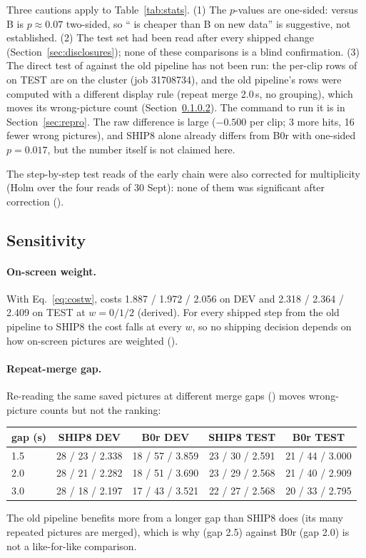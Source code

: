Three cautions apply to Table~\ref{tab:stats}. (1) The $p$-values are one-sided: \Dp{} versus B is $p \approx 0.07$
two-sided, so ``\Dp{} is cheaper than B on new data'' is suggestive, not established. (2) The test set had been read
after every shipped change (Section~\ref{sec:disclosures}); none of these comparisons is a blind confirmation. (3) The
direct test of \Dp{} against the old pipeline has not been run: the per-clip rows of \Dp{} on TEST are on the cluster
(job 31708734), and the old pipeline's rows were computed with a different display rule (repeat merge 2.0\,s, no
grouping), which moves its wrong-picture count (Section~\ref{sec:mergegap}). The command to run it is in
Section~\ref{sec:repro}. The raw difference is large ($-0.500$ per clip; 3 more hits, 16 fewer wrong pictures), and
SHIP8 alone already differs from B0r with one-sided $p = 0.017$, but the number itself is not claimed here.

The step-by-step test reads of the early chain were also corrected for multiplicity (Holm over the four reads of
30 Sept): none of them was significant after correction ().

\subsection{Sensitivity}\label{sec:sensitivity}
\paragraph{On-screen weight.} With Eq.~\ref{eq:costw}, \Dp{} costs 1.887 / 1.972 / 2.056 on DEV and 2.318 / 2.364 /
2.409 on TEST at $w = 0 / 1 / 2$ (derived). For every shipped step from the old pipeline to SHIP8 the cost falls at
every $w$, so no shipping decision depends on how on-screen pictures are weighted
().

\paragraph{Repeat-merge gap.}\label{sec:mergegap} Re-reading the same saved pictures at different merge gaps
() moves wrong-picture counts but not the ranking:
\begin{center}\small
\begin{tabular}{lcccc}
\toprule
gap (s) & SHIP8 DEV & B0r DEV & SHIP8 TEST & B0r TEST \\
\midrule
1.5 & 28 / 23 / 2.338 & 18 / 57 / 3.859 & 23 / 30 / 2.591 & 21 / 44 / 3.000 \\
2.0 & 28 / 21 / 2.282 & 18 / 51 / 3.690 & 23 / 29 / 2.568 & 21 / 40 / 2.909 \\
3.0 & 28 / 18 / 2.197 & 17 / 43 / 3.521 & 22 / 27 / 2.568 & 20 / 33 / 2.795 \\
\bottomrule
\end{tabular}
\end{center}
The old pipeline benefits more from a longer gap than SHIP8 does (its many repeated pictures are merged), which is why
\Dp{} (gap 2.5) against B0r (gap 2.0) is not a like-for-like comparison.

